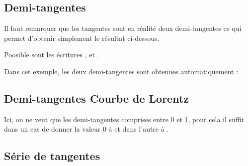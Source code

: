 \subsection{Demi-tangentes }
Il faut remarquer que les tangentes sont en réalité deux demi-tangentes ce qui permet d'obtenir simplement le résultat ci-dessous.

Poosible sont les écritures ,    et .

Dans cet exemple, les deux demi-tangentes sont obtenues automatiquement :

\begin{tkzexample}[]
\end{tkzexample}
\subsection{Demi-tangentes Courbe de Lorentz }

Ici, on ne veut que les demi-tangentes comprises entre 0 et 1, pour cela il suffit dans un cas de donner la valeur 0 à  et dans l'autre à .

\begin{center}
\begin{tkzexample}[vbox]
\end{tkzexample}
\end{center}
\subsection{Série de tangentes}


